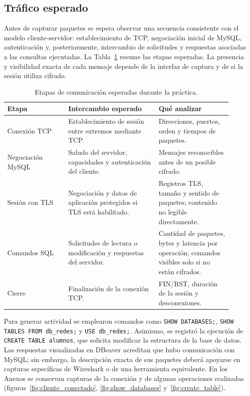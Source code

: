 \documentclass[10pt,a4paper]{article}
\begin{document}
\subsection{Tráfico esperado}
\label{sub:esperado}
Antes de capturar paquetes se espera observar una secuencia consistente con el modelo cliente-servidor: establecimiento de TCP, negociación inicial de MySQL, autenticación y, posteriormente, intercambio de solicitudes y respuestas asociadas a las consultas ejecutadas. La Tabla~\ref{tab:traficoesperado} resume las etapas esperadas. La presencia y visibilidad exacta de cada mensaje depende de la interfaz de captura y de si la sesión utiliza cifrado.

\begin{table}[htbp]
\centering
\caption{Etapas de comunicación esperadas durante la práctica.}
\label{tab:traficoesperado}
\small
\begin{tabular}{p{0.25\linewidth}p{0.37\linewidth}p{0.30\linewidth}}
\toprule
\textbf{Etapa} & \textbf{Intercambio esperado} & \textbf{Qué analizar}\\
\midrule
Conexión TCP & Establecimiento de sesión entre extremos mediante TCP. & Direcciones, puertos, orden y tiempos de paquetes.\\
Negociación MySQL & Saludo del servidor, capacidades y autenticación del cliente. & Mensajes reconocibles antes de un posible cifrado.\\
Sesión con TLS & Negociación y datos de aplicación protegidos si TLS está habilitado. & Registros TLS, tamaño y sentido de paquetes; contenido no legible directamente.\\
Comandos SQL & Solicitudes de lectura o modificación y respuestas del servidor. & Cantidad de paquetes, bytes y latencia por operación; comandos visibles solo si no están cifrados.\\
Cierre & Finalización de la conexión TCP. & FIN/RST, duración de la sesión y desconexiones.\\
\bottomrule
\end{tabular}
\end{table}

Para generar actividad se emplearon comandos como \texttt{SHOW DATABASES;}, \texttt{SHOW TABLES FROM db\_redes;} y \texttt{USE db\_redes;}. Asimismo, se registró la ejecución de \texttt{CREATE TABLE alumnos}, que solicita modificar la estructura de la base de datos. Las respuestas visualizadas en DBeaver acreditan que hubo comunicación con MySQL; sin embargo, la descripción exacta de sus paquetes deberá apoyarse en capturas específicas de Wireshark o de una herramienta equivalente. En los Anexos se conservan capturas de la conexión y de algunas operaciones realizadas (figuras~\ref{fig:cliente_conectado}, \ref{fig:show_databases} y~\ref{fig:create_table}).
\end{document}
